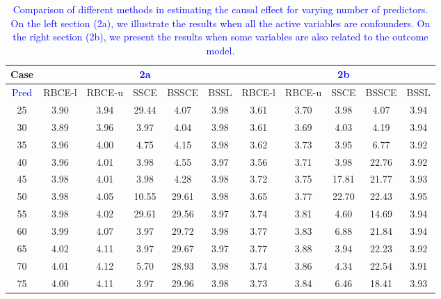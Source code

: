 \documentclass[preprint,12pt]{elsarticle}
\newcommand{\added}[1]{\textcolor{blue}{#1}}
\begin{document}
\begin{table}[ht]
\centering
\tiny
\caption{\added{Comparison of different methods in estimating the causal effect for varying number of predictors. On the left section (2a), we illustrate the results when all the active variables are confounders. On the right section (2b), we present the results when some variables are also related to the outcome model.}}
\begin{tabular}{c|ccccc|ccccc}
  \hline
 Case&  &  & \added{2a} &  &  &  &  & \added{2b} &  &  \\ 
  \hline
 \added{Pred} & RBCE-l & RBCE-u & SSCE & BSSCE & BSSL & RBCE-l & RBCE-u & SSCE & BSSCE & BSSL \\ 
  \hline
 25 & 3.90 & 3.94 & 29.44 & 4.07 & 3.98 & 3.61 & 3.70 & 3.98 & 4.07 & 3.94 \\ 
 30 & 3.89 & 3.96 & 3.97 & 4.04 & 3.98 & 3.61 & 3.69 & 4.03 & 4.19 & 3.94 \\ 
 35 & 3.96 & 4.00 & 4.75 & 4.15 & 3.98 & 3.62 & 3.73 & 3.95 & 6.77 & 3.92 \\ 
 40 & 3.96 & 4.01 & 3.98 & 4.55 & 3.97 & 3.56 & 3.71 & 3.98 & 22.76 & 3.92 \\ 
 45 & 3.98 & 4.01 & 3.98 & 4.28 & 3.98 & 3.72 & 3.75 & 17.81 & 21.77 & 3.93 \\ 
 50 & 3.98 & 4.05 & 10.55 & 29.61 & 3.98 & 3.65 & 3.77 & 22.70 & 22.43 & 3.95 \\ 
 55 & 3.98 & 4.02 & 29.61 & 29.56 & 3.97 & 3.74 & 3.81 & 4.60 & 14.69 & 3.94 \\ 
 60 & 3.99 & 4.07 & 3.97 & 29.72 & 3.98 & 3.77 & 3.83 & 6.88 & 21.84 & 3.94 \\ 
 65 & 4.02 & 4.11 & 3.97 & 29.67 & 3.97 & 3.77 & 3.88 & 3.94 & 22.23 & 3.92 \\ 
 70 & 4.01 & 4.12 & 5.70 & 28.93 & 3.98 & 3.74 & 3.86 & 4.34 & 22.54 & 3.91 \\ 
 75 & 4.00 & 4.11 & 3.97 & 29.96 & 3.98 & 3.73 & 3.84 & 6.46 & 18.41 & 3.93 \\ 
 \hline
\end{tabular}
\label{tab:causal2}
\end{table}
\end{document}
